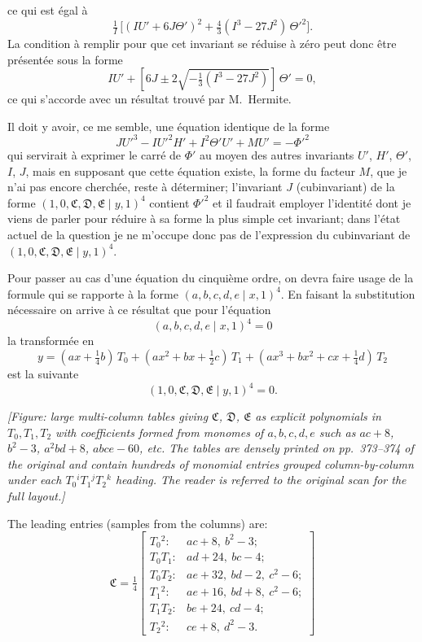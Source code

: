 \documentclass[11pt]{article}
\newcommand{\Cdel}{\mid}
\begin{document}
\medskip

\noindent ce qui est \'egal \`a
\[
\tfrac{1}{I}\,\big[(I U' + 6 J \Theta')^2 + \tfrac{4}{3}(I^3 - 27 J^2)\, \Theta'^2\big].
\]
La condition \`a remplir pour que cet invariant se r\'eduise \`a z\'ero peut donc \^etre pr\'esent\'ee sous la forme
\[
I U' + [6 J \pm 2 \sqrt{-\tfrac{1}{3}(I^3 - 27 J^2)}]\, \Theta' = 0,
\]
ce qui s'accorde avec un r\'esultat trouv\'e par M.~Hermite.

\medskip

Il doit y avoir, ce me semble, une \'equation identique de la forme
\[
J U'^3 - I U'^2 H' + I^2 \Theta' U' + M U' = -\Phi'^2
\]
qui servirait \`a exprimer le carr\'e de $\Phi'$ au moyen des autres invariants $U'$, $H'$, $\Theta'$, $I$, $J$, mais en supposant que cette \'equation existe, la forme du facteur $M$, que je n'ai pas encore cherch\'ee, reste \`a d\'eterminer; l'invariant $J$ (cubinvariant) de la forme $(1, 0, \mathfrak{C}, \mathfrak{D}, \mathfrak{E} \Cdel y, 1)^4$ contient $\Phi'^2$ et il faudrait employer l'identit\'e dont je viens de parler pour r\'eduire \`a sa forme la plus simple cet invariant; dans l'\'etat actuel de la question je ne m'occupe donc pas de l'expression du cubinvariant de $(1, 0, \mathfrak{C}, \mathfrak{D}, \mathfrak{E} \Cdel y, 1)^4$.

\medskip

Pour passer au cas d'une \'equation du cinqui\`eme ordre, on devra faire usage de la formule qui se rapporte \`a la forme $(a, b, c, d, e \Cdel x, 1)^4$. En faisant la substitution n\'ecessaire on arrive \`a ce r\'esultat que pour l'\'equation
\[
(a, b, c, d, e \Cdel x, 1)^4 = 0
\]
la transform\'ee en
\[
y = (a x + \tfrac{1}{4} b)\, T_0 + (a x^2 + b x + \tfrac{1}{2} c)\, T_1 + (a x^3 + b x^2 + c x + \tfrac{1}{4} d)\, T_2
\]
est la suivante
\[
(1, 0, \mathfrak{C}, \mathfrak{D}, \mathfrak{E} \Cdel y, 1)^4 = 0.
\]

\medskip

\textit{[Figure: large multi-column tables giving $\mathfrak{C}$, $\mathfrak{D}$, $\mathfrak{E}$ as explicit polynomials in $T_0, T_1, T_2$ with coefficients formed from monomes of $a, b, c, d, e$ such as $ac+8$, $b^2-3$, $a^2bd+8$, $abce-60$, etc. The tables are densely printed on pp.~373--374 of the original and contain hundreds of monomial entries grouped column-by-column under each $T_0{}^i T_1{}^j T_2{}^k$ heading. The reader is referred to the original scan for the full layout.]}

\medskip

The leading entries (samples from the columns) are:
\[
\mathfrak{C} = \tfrac{1}{4}\!\left[
\begin{array}{lll}
T_0{}^2: & ac + 8,\ b^2 - 3; \\
T_0 T_1: & ad + 24,\ bc - 4; \\
T_0 T_2: & ae + 32,\ bd - 2,\ c^2 - 6; \\
T_1{}^2: & ae + 16,\ bd + 8,\ c^2 - 6; \\
T_1 T_2: & be + 24,\ cd - 4; \\
T_2{}^2: & ce + 8,\ d^2 - 3.
\end{array}
\right]
\]
\end{document}
